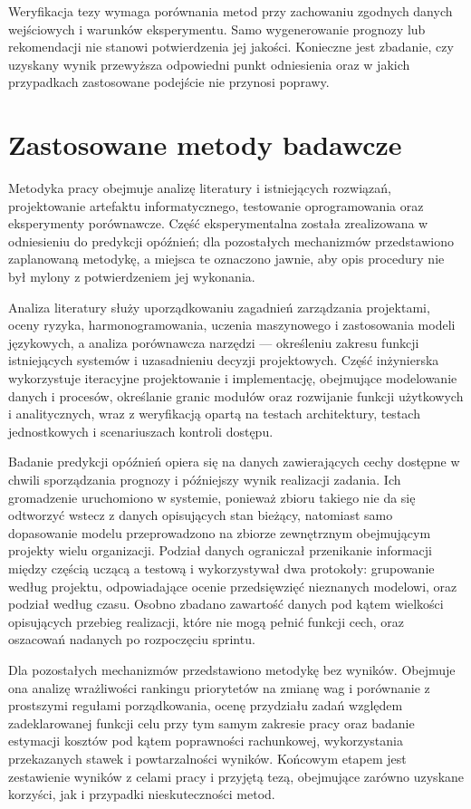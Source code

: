 Weryfikacja tezy wymaga porównania metod przy zachowaniu zgodnych danych wejściowych i warunków eksperymentu. Samo wygenerowanie prognozy lub rekomendacji nie stanowi potwierdzenia jej jakości. Konieczne jest zbadanie, czy uzyskany wynik przewyższa odpowiedni punkt odniesienia oraz w jakich przypadkach zastosowane podejście nie przynosi poprawy.

\section{Zastosowane metody badawcze}

Metodyka pracy obejmuje analizę literatury i istniejących rozwiązań, projektowanie artefaktu informatycznego, testowanie oprogramowania oraz eksperymenty porównawcze. Część eksperymentalna została zrealizowana w odniesieniu do predykcji opóźnień; dla pozostałych mechanizmów przedstawiono zaplanowaną metodykę, a miejsca te oznaczono jawnie, aby opis procedury nie był mylony z potwierdzeniem jej wykonania.

Analiza literatury służy uporządkowaniu zagadnień zarządzania projektami, oceny ryzyka, harmonogramowania, uczenia maszynowego i zastosowania modeli językowych, a analiza porównawcza narzędzi — określeniu zakresu funkcji istniejących systemów i uzasadnieniu decyzji projektowych. Część inżynierska wykorzystuje iteracyjne projektowanie i implementację, obejmujące modelowanie danych i procesów, określanie granic modułów oraz rozwijanie funkcji użytkowych i analitycznych, wraz z weryfikacją opartą na testach architektury, testach jednostkowych i scenariuszach kontroli dostępu.

Badanie predykcji opóźnień opiera się na danych zawierających cechy dostępne w chwili sporządzania prognozy i późniejszy wynik realizacji zadania. Ich gromadzenie uruchomiono w systemie, ponieważ zbioru takiego nie da się odtworzyć wstecz z danych opisujących stan bieżący, natomiast samo dopasowanie modelu przeprowadzono na zbiorze zewnętrznym obejmującym projekty wielu organizacji. Podział danych ograniczał przenikanie informacji między częścią uczącą a testową i wykorzystywał dwa protokoły: grupowanie według projektu, odpowiadające ocenie przedsięwzięć nieznanych modelowi, oraz podział według czasu. Osobno zbadano zawartość danych pod kątem wielkości opisujących przebieg realizacji, które nie mogą pełnić funkcji cech, oraz oszacowań nadanych po rozpoczęciu sprintu.

Dla pozostałych mechanizmów przedstawiono metodykę bez wyników. Obejmuje ona analizę wrażliwości rankingu priorytetów na zmianę wag i porównanie z prostszymi regułami porządkowania, ocenę przydziału zadań względem zadeklarowanej funkcji celu przy tym samym zakresie pracy oraz badanie estymacji kosztów pod kątem poprawności rachunkowej, wykorzystania przekazanych stawek i powtarzalności wyników. Końcowym etapem jest zestawienie wyników z celami pracy i przyjętą tezą, obejmujące zarówno uzyskane korzyści, jak i przypadki nieskuteczności metod.

